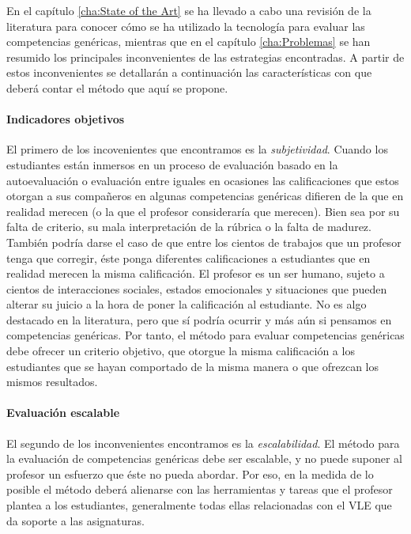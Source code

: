En el capítulo \ref{cha:State of the Art} se ha llevado a cabo una revisión de la literatura para conocer cómo se ha utilizado la tecnología para evaluar las competencias genéricas, mientras que en el capítulo \ref{cha:Problemas} se han resumido los principales inconvenientes de las estrategias encontradas. A partir de estos inconvenientes se detallarán a continuación las características con que deberá contar el método que aquí se propone.

\paragraph*{Indicadores objetivos}

El primero de los incovenientes que encontramos es la \emph{subjetividad}. Cuando los estudiantes están inmersos en un proceso de evaluación basado en la autoevaluación o evaluación entre iguales en ocasiones las calificaciones que estos otorgan a sus compañeros en algunas competencias genéricas difieren de la que en realidad merecen (o la que el profesor consideraría que merecen). Bien sea por su falta de criterio, su mala interpretación de la rúbrica o la falta de madurez. También podría darse el caso de que entre los cientos de trabajos que un profesor tenga que corregir, éste ponga diferentes calificaciones a estudiantes que en realidad merecen la misma calificación. El profesor es un ser humano, sujeto a cientos de interacciones sociales, estados emocionales y situaciones que pueden alterar su juicio a la hora de poner la calificación al estudiante. No es algo destacado en la literatura, pero que sí podría ocurrir y más aún si pensamos en competencias genéricas. Por tanto, el método para evaluar competencias genéricas debe ofrecer un criterio objetivo, que otorgue la misma calificación a los estudiantes que se hayan comportado de la misma manera o que ofrezcan los mismos resultados.

\paragraph*{Evaluación escalable}

El segundo de los inconvenientes encontramos es la \emph{escalabilidad}. El método para la evaluación de competencias genéricas debe ser escalable, y no puede suponer al profesor un esfuerzo que éste no pueda abordar. Por eso, en la medida de lo posible el método deberá alienarse con las herramientas y tareas que el profesor plantea a los estudiantes, generalmente todas ellas relacionadas con el VLE que da soporte a las asignaturas.

